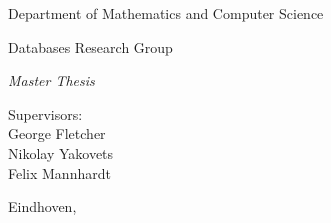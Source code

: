 \makeatletter
\let\thetitle\@title
\let\theauthor\@author
\let\thedate\@date
\makeatother

\begin{titlepage}
  \begin{center}
    \Large
    Department of Mathematics and Computer Science

    \Large
    Databases Research Group

    \vfill

    \Huge
    \textbf{\thetitle}

    \vspace*{0.25cm}

    \LARGE
    \textit{Master Thesis}

    \vfill

    \LARGE
    \theauthor

    \vfill

    \Large
    Supervisors:\\
    George Fletcher\\
    Nikolay Yakovets\\
    Felix Mannhardt

    \vspace*{0.5cm}

    \Large
    Eindhoven, \thedate
  \end{center}
\end{titlepage}
